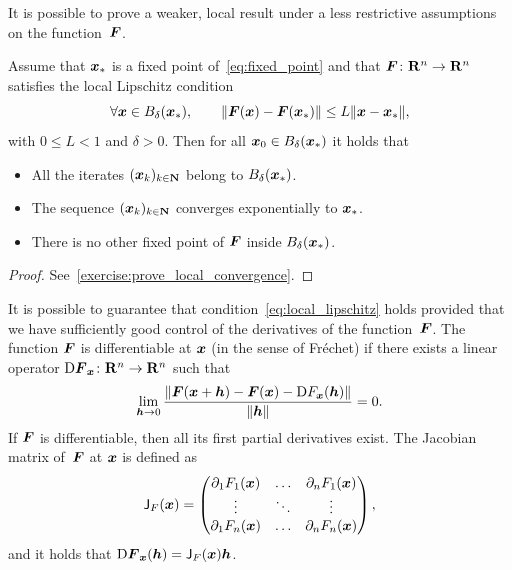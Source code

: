 
It is possible to prove a weaker, local result under a less restrictive assumptions on the function~$\mathbf{\boldsymbol{F}}$.
\begin{theorem}
    \label{theorem:local_convergence}
    Assume that $\mathbf{\boldsymbol{x}}_*$ is a fixed point of~\eqref{eq:fixed_point} and that $\mathbf{\boldsymbol{F}}\colon \mathbf R^n \to \mathbf R^n$ satisfies the local Lipschitz condition
    \begin{equation}
        \label{eq:local_lipschitz}
        \forall \vect x \in B_{\delta}(\vect x_*), \qquad
        \norm[big]{\vect F(\vect x) - \vect F(\vect x_*)} \leq L \norm{\vect x - \vect x_*},
    \end{equation}
    with $0 \leq L < 1$ and $\delta > 0$.
    Then for all $\mathbf{\boldsymbol{x}}_0 \in B_{\delta}(\mathbf{\boldsymbol{x}}_*)$ it holds that
    \begin{itemize}
        \item All the iterates $(\mathbf{\boldsymbol{x}}_k)_{k \in \mathbf N}$ belong to $B_{\delta}(\mathbf{\boldsymbol{x}}_*)$.
        \item The sequence $(\mathbf{\boldsymbol{x}}_k)_{k \in \mathbf N}$ converges exponentially to $\mathbf{\boldsymbol{x}}_*$.
        \item There is no other fixed point of $\mathbf{\boldsymbol{F}}$ inside $B_{\delta}(\mathbf{\boldsymbol{x}}_*)$.
    \end{itemize}
\end{theorem}
\begin{proof}
    See~\cref{exercise:prove_local_convergence}.
\end{proof}
It is possible to guarantee that condition~\eqref{eq:local_lipschitz} holds provided that
we have sufficiently good control of the derivatives of the function~$\mathbf{\boldsymbol{F}}$.
The function $\mathbf{\boldsymbol{F}}$ is differentiable at $\mathbf{\boldsymbol{x}}$ (in the sense of Fréchet) if
there exists a linear operator $\mathrm D \mathbf{\boldsymbol{F}}_{\mathbf{\boldsymbol{x}}} \colon \mathbf R^n \to \mathbf R^n$ such that
\begin{equation}
    \label{eq:limit_differentiability}
    \lim_{\mathbf{\boldsymbol{h}} \to 0} \frac{\lVert\mathbf{\boldsymbol{F}}(\mathbf{\boldsymbol{x}} + \mathbf{\boldsymbol{h}}) - \mathbf{\boldsymbol{F}}(\mathbf{\boldsymbol{x}}) - \mathrm D F_{\mathbf{\boldsymbol{x}}}(\mathbf{\boldsymbol{h}})\rVert}{\lVert\mathbf{\boldsymbol{h}}\rVert}
    = 0.
\end{equation}
If $\mathbf{\boldsymbol{F}}$ is differentiable,
then all its first partial derivatives exist.
The Jacobian matrix of~$\mathbf{\boldsymbol{F}}$ at $\mathbf{\boldsymbol{x}}$ is defined as
\[
    \mathsf J_F(\mathbf{\boldsymbol{x}}) =
    \begin{pmatrix}
        \partial_{1} F_1(\mathbf{\boldsymbol{x}}) & \hdots & \partial_n F_1(\mathbf{\boldsymbol{x}}) \\
        \vdots & \ddots & \vdots \\
        \partial_{1} F_n(\mathbf{\boldsymbol{x}}) & \hdots & \partial_n F_n(\mathbf{\boldsymbol{x}})
    \end{pmatrix},
\]
and it holds that $\mathrm D \mathbf{\boldsymbol{F}}_{\mathbf{\boldsymbol{x}}}(\mathbf{\boldsymbol{h}}) = \mathsf J_F(\mathbf{\boldsymbol{x}}) \mathbf{\boldsymbol{h}}$.

